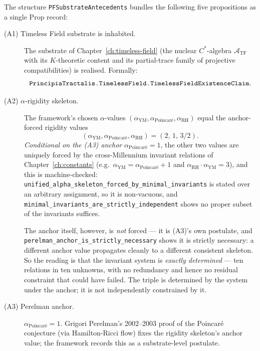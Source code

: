 \begin{definition}
\label{def:pf-substrate-antecedents}
The structure \texttt{PFSubstrateAntecedents} bundles the
following five propositions as a single Prop record:
\begin{description}
\item[\textnormal{(A1) Timeless Field substrate is inhabited.}]
The substrate of Chapter~\ref{ch:timeless-field} (the nuclear
$C^*$-algebra $\mathcal{A}_{\text{TF}}$ with its
$K$-theoretic content and its partial-trace family of
projective compatibilities) is realised. Formally:
\[
\texttt{Principia\allowbreak{}Tractalis.\allowbreak{}TimelessField.\allowbreak{}Timeless\allowbreak{}Field\allowbreak{}Existence\allowbreak{}Claim}.
\]

\item[\textnormal{(A2) $\alpha$-rigidity skeleton.}]
The framework's chosen $\alpha$-values
$(\alpha_{\text{YM}}, \alpha_{\text{Poincar\'e}},
\alpha_{\text{RH}})$ equal the anchor-forced rigidity
values
\[
(\alpha_{\text{YM}}, \alpha_{\text{Poincar\'e}},
\alpha_{\text{RH}}) = (2, \,1, \,3/2).
\]
\emph{Conditional on the (A3) anchor} $\alpha_{\text{Poincar\'e}} = 1$, the other
two values are uniquely forced by the cross-Millennium invariant
relations of Chapter~\ref{ch:constants} (e.g.\ $\alpha_{\text{YM}}
= \alpha_{\text{Poincar\'e}} + 1$ and $\alpha_{\text{RH}}
\cdot \alpha_{\text{YM}} = 3$), and this is machine-checked:
\texttt{unified\_alpha\_skeleton\_forced\_by\_minimal\_invariants}
is stated over an arbitrary assignment, so it is non-vacuous, and
\texttt{minimal\_invariants\_are\_strictly\_independent} shows no proper
subset of the invariants suffices.

The anchor itself, however, is \emph{not} forced --- it is (A3)'s own
postulate, and \texttt{perelman\_anchor\_is\_strictly\_necessary} shows it
is strictly necessary: a different anchor value propagates cleanly to a
different consistent skeleton. So the reading is that the invariant
system is \emph{exactly determined} --- ten relations in ten unknowns, with
no redundancy and hence no residual constraint that could have failed. The
triple is determined by the system under the anchor; it is not independently
constrained by it.

\item[\textnormal{(A3) Perelman anchor.}]
$\alpha_{\text{Poincar\'e}} = 1$. Grigori Perelman's 2002--2003
proof of the Poincar\'e conjecture (via Hamilton-Ricci flow)
fixes the rigidity skeleton's anchor value; the framework
records this as a substrate-level postulate.


\end{description}
\end{definition}
